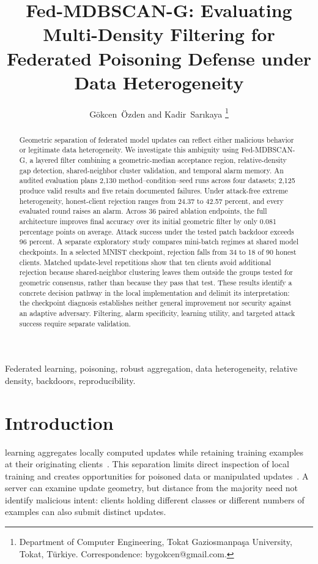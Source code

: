 \documentclass[journal]{IEEEtran}
\newcommand{\method}{Fed-MDBSCAN-G}
\begin{document}
\title{\method{}: Evaluating Multi-Density Filtering for Federated Poisoning Defense under Data Heterogeneity}
\author{G\"okcen~\"Ozden and Kadir~Sar{\i}kaya%
\thanks{Department of Computer Engineering, Tokat Gaziosmanpa\c{s}a University, Tokat, T\"urkiye. Correspondence: bygokcen@gmail.com.}}
\maketitle
\begin{abstract}
Geometric separation of federated model updates can reflect either malicious behavior or legitimate data heterogeneity. We investigate this ambiguity using Fed-MDBSCAN-G, a layered filter combining a geometric-median acceptance region, relative-density gap detection, shared-neighbor cluster validation, and temporal alarm memory. An audited evaluation plans 2,130 method--condition--seed runs across four datasets; 2,125 produce valid results and five retain documented failures. Under attack-free extreme heterogeneity, honest-client rejection ranges from 24.37 to 42.57 percent, and every evaluated round raises an alarm. Across 36 paired ablation endpoints, the full architecture improves final accuracy over its initial geometric filter by only 0.081 percentage points on average. Attack success under the tested patch backdoor exceeds 96 percent. A separate exploratory study compares mini-batch regimes at shared model checkpoints. In a selected MNIST checkpoint, rejection falls from 34 to 18 of 90 honest clients. Matched update-level repetitions show that ten clients avoid additional rejection because shared-neighbor clustering leaves them outside the groups tested for geometric consensus, rather than because they pass that test. These results identify a concrete decision pathway in the local implementation and delimit its interpretation: the checkpoint diagnosis establishes neither general improvement nor security against an adaptive adversary. Filtering, alarm specificity, learning utility, and targeted attack success require separate validation.
\end{abstract}
\begin{IEEEkeywords}
Federated learning, poisoning, robust aggregation, data heterogeneity, relative density, backdoors, reproducibility.
\end{IEEEkeywords}
\IEEEpeerreviewmaketitle

\section{Introduction}
 learning aggregates locally computed updates while retaining training examples at their originating clients~\cite{mcmahan2017}. This separation limits direct inspection of local training and creates opportunities for poisoned data or manipulated updates~\cite{fang2020,bagdasaryan2020}. A server can examine update geometry, but distance from the majority need not identify malicious intent: clients holding different classes or different numbers of examples can also submit distinct updates.
\end{document}

